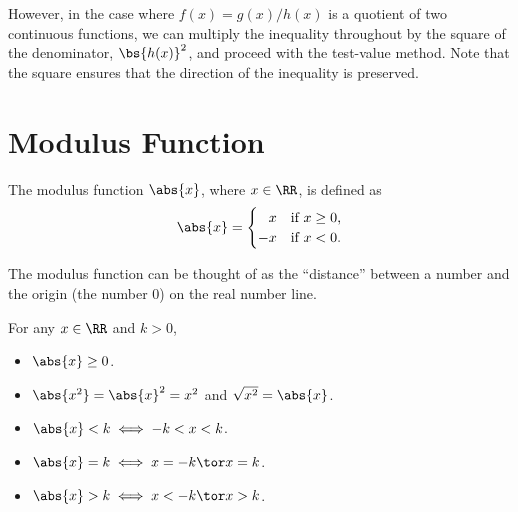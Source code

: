 However, in the case where $f(x) = g(x)/h(x)$ is a quotient of two continuous functions, we can multiply the inequality throughout by the square of the denominator, $\bs{h(x)}^2$, and proceed with the test-value method. Note that the square ensures that the direction of the inequality is preserved.

\section{Modulus Function}

\begin{definition}
    The modulus function $\abs{x}$, where $x \in \RR$, is defined as \[\abs{x} = \begin{cases}
        \phantom{-}x & \text{if $x \geq 0$,}\\
        -x & \text{if $x < 0$.}
    \end{cases}\]
\end{definition}

The modulus function can be thought of as the ``distance'' between a number and the origin (the number 0) on the real number line.

\begin{fact}
    For any $x \in \RR$ and $k > 0$,
    \begin{itemize}
        \item $\abs{x} \geq 0$.
        \item $\abs{x^2} = \abs{x}^2 = x^2$ and $\sqrt{x^2} = \abs{x}$.
        \item $\abs{x} < k \iff -k < x < k$.
        \item $\abs{x} = k \iff x = -k \tor x = k$.
        \item $\abs{x} > k \iff x < -k \tor x > k$.
    \end{itemize}
\end{fact}